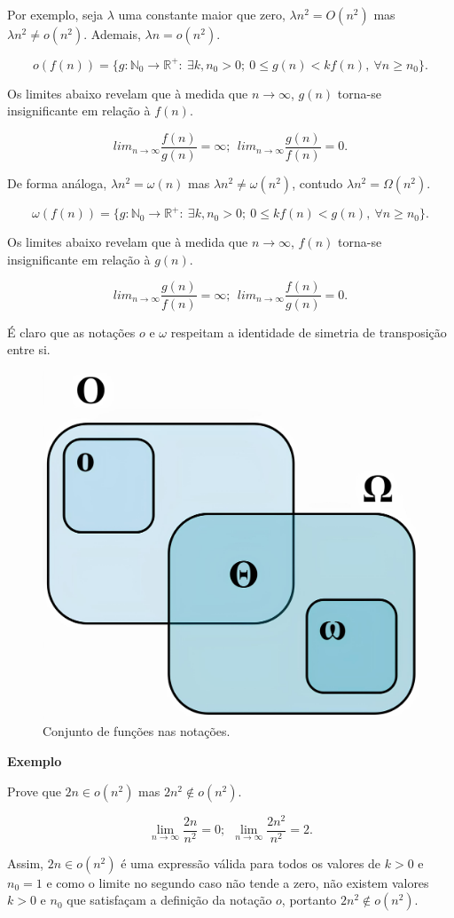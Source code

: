Por exemplo, seja $\lambda$ uma constante maior que zero, $\lambda n^2 = O(n^2)$ mas $\lambda n^2 \neq o(n^2)$. Ademais, $\lambda n = o(n^2)$.

\[o(f(n)) = \{g: \mathbb{N}_0 \rightarrow \mathbb{R}^{+}: \ \exists k, n_0 > 0 ; \ 0\leq g(n) < kf(n), \ \forall n \geq n_0\}.\]

Os limites abaixo revelam que à medida que $n \rightarrow \infty$, $g(n)$ torna-se insignificante em relação à $f(n)$.

\[lim_{n\rightarrow\infty} \frac{f(n)}{g(n)}=\infty; \ \ lim_{n\rightarrow\infty} \frac{g(n)}{f(n)}=0.\]

De forma análoga, $\lambda n^2 = \omega(n)$ mas $\lambda n^2 \neq \omega(n^2)$, contudo $\lambda n^2 = \Omega(n^2)$.

\[\omega(f(n)) = \{g: \mathbb{N}_0 \rightarrow \mathbb{R}^{+}:  \ \exists k, n_0 > 0 ; \ 0\leq kf(n) < g(n), \ \forall n \geq n_0\} .\]

Os limites abaixo revelam que à medida que $n \rightarrow \infty$, $f(n)$ torna-se insignificante em relação à $g(n)$.

\[lim_{n\rightarrow\infty} \frac{g(n)}{f(n)}=\infty; \ \ lim_{n\rightarrow\infty} \frac{f(n)}{g(n)}=0.\]

É claro que as notações $o$ e $\omega$ respeitam a identidade de simetria de transposição entre si.

\begin{figure}
  \centering
  \includegraphics[width=0.4\linewidth]{img/conjuntosnotacoes.jpg}
    \caption{Conjunto de funções nas notações.}
    \label{conjuntonotacoes}
\end{figure}

\textbf{Exemplo}

Prove que $2n\in o(n^2)$ mas $2n^2\notin o(n^2)$.

\[\lim_{n\rightarrow\infty}\frac{2n}{n^2}=0; \ \ \lim_{n\rightarrow\infty}\frac{2n^2}{n^2}=2.\]

Assim, $2n\in o(n^2)$ é uma expressão válida para todos os valores de $k>0$ e $n_0=1$ e como o limite no segundo caso não tende a zero, não existem valores $k>0$ e $n_0$ que satisfaçam a definição da notação $o$, portanto $2n^2\notin o(n^2)$.

